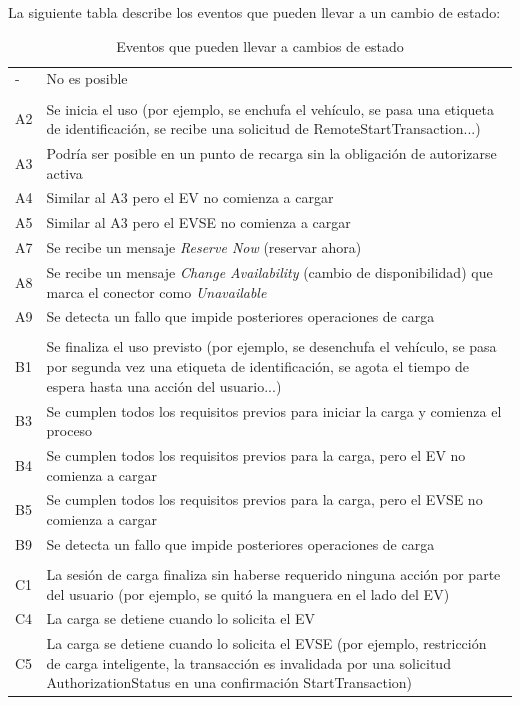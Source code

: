 \documentclass[12pt,a4paper,onecolumn,oneside]{report}
\begin{document}
La siguiente tabla describe los eventos que pueden llevar a un cambio de estado:

\begin{longtable}{|p{1cm}|p{14cm}|}
\caption{Eventos que pueden llevar a cambios de estado}
\label{Eventos que pueden llevar a cambios de estado}
\endfirsthead
\endhead
\hline
- & No es posible \\ 
 & \\
A2 & Se inicia el uso (por ejemplo, se enchufa el vehículo, se pasa una etiqueta de identificación, se recibe una solicitud de RemoteStartTransaction...) \\ 
A3 & Podría ser posible en un punto de recarga sin la obligación de autorizarse activa \\ 
A4 & Similar al A3 pero el EV no comienza a cargar \\ 
A5 & Similar al A3 pero el EVSE no comienza a cargar \\ 
A7 & Se recibe un mensaje \textit{Reserve Now} (reservar ahora) \\ 
A8 & Se recibe un mensaje \textit{Change Availability} (cambio de disponibilidad) que marca el conector como \textit{Unavailable} \\
A9 & Se detecta un fallo que impide posteriores operaciones de carga \\ 
 & \\
B1 & Se finaliza el uso previsto (por ejemplo, se desenchufa el vehículo, se pasa por segunda vez una etiqueta de identificación, se agota el tiempo de espera hasta una acción del usuario...) \\
B3 & Se cumplen todos los requisitos previos para iniciar la carga y comienza el proceso\\
B4 & Se cumplen todos los requisitos previos para la carga, pero el EV no comienza a cargar \\
B5 & Se cumplen todos los requisitos previos para la carga, pero el EVSE no comienza a cargar \\
B9 & Se detecta un fallo que impide posteriores operaciones de carga \\
 & \\
C1 & La sesión de carga finaliza sin haberse requerido ninguna acción por parte del usuario (por ejemplo, se quitó la manguera en el lado del EV)\\
C4 & La carga se detiene cuando lo solicita el EV\\
C5 & La carga se detiene cuando lo solicita el EVSE (por ejemplo, restricción de carga inteligente, la transacción es invalidada por una solicitud AuthorizationStatus en una confirmación StartTransaction)\\

\end{longtable}
\end{document}
